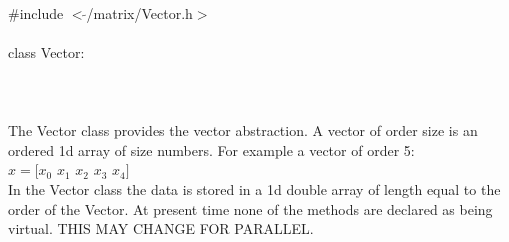 
   \\
\indent \#include $<\tilde{}$/matrix/Vector.h$>$  \\

  \\
\indent class Vector:  \\

 \\
 \\

  \\
\indent The Vector class provides the vector abstraction. A vector of
order \p size is an ordered 1d array of \p size numbers. For
example a vector of order 5: \\

\indent\indent $ x = [x_0$ $x_1$ $x_2$  $x_3$ $x_4]$ \\


In the Vector class the data is stored in a 1d double array of length
equal to the order of the Vector.  At present time none of the methods
are declared as being virtual. THIS MAY CHANGE FOR PARALLEL. \\

